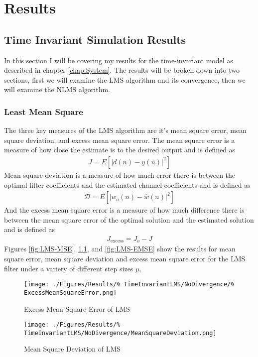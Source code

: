 \chapter{Results}
\label{chap:Results}
\section{Time Invariant Simulation Results}
In this section I will be covering my results for the time-invariant %
model as described in chapter \ref{chap:System}. The results will be %
broken down into two sections, first we will examine the %
LMS algorithm and its convergence, then we will examine the NLMS %
algorithm.

\subsection{Least Mean Square}
\FloatBarrier
The three key measures of the LMS algorithm are it's mean square %
error, mean square deviation, and excess mean square error. %
The mean square error is a measure of how close the estimate %
is to the desired output and is defined as 
\begin{align}
	J = E\left[ \lvert d(n) - y(n) \rvert^{2} \right]
\end{align}
Mean square deviation is a measure of how much error there is %
between the optimal filter coefficients and the estimated %
channel coefficients and is defined as
\begin{align}
	\mathscr{D} = E\left[ \lvert w_{o}(n) - \hat{w}(n) \rvert^{2} \right]
\end{align}
And the excess mean square error is a measure of how much %
difference there is between the mean square error of the %
optimal solution and the estimated solution and is defined as
\begin{align}
	J_{\text{excess}} = J_{o} - J
\end{align}
Figures \ref{fig:LMS-MSE}, \ref{fig:LMS-MSD}, and \ref{fig:LMS-EMSE} %
show the results for mean square error, mean square deviation and %
excess mean square error for the LMS filter under a variety of %
different step sizes $\mu$.
\begin{figure}[ht]
	\centering
	\begin{minipage}{0.49\textwidth}
		\centering
		\texttt{[image: ./Figures/Results/\%
		TimeInvariantLMS/NoDivergence/\%
		ExcessMeanSquareError.png]}
		\captionsetup{width=0.75\linewidth}
		\caption{Excess Mean Square Error of LMS}
		\label{fig:LMS-EMSE}
	\end{minipage}
	\begin{minipage}{0.49\textwidth}
		\centering
		\texttt{[image: ./Figures/Results/\%
		TimeInvariantLMS/NoDivergence/MeanSquareDeviation.png]}
		\captionsetup{width=0.75\linewidth}
		\caption{Mean Square Deviation of LMS}
		\label{fig:LMS-MSD}
	\end{minipage}
\end{figure}
